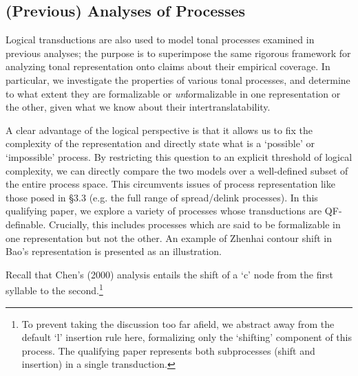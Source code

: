 \documentclass{article}
\begin{document}
\subsection{(Previous) Analyses of Processes}
Logical transductions are also used to model tonal processes examined in previous analyses; the purpose is to superimpose the same rigorous framework for analyzing tonal representation onto claims about their empirical coverage. In particular, we investigate the properties of various tonal processes, and determine to what extent they are formalizable or \emph{un}formalizable in one representation or the other, given what we know about their intertranslatability. \par
A clear advantage of the logical perspective is that it allows us to fix the complexity of the representation and directly state what is a `possible' or `impossible' process. By restricting this question to an explicit threshold of logical complexity, we can directly compare the two models over a well-defined subset of the entire process space. This circumvents issues of process representation like those posed in \S3.3 (e.g. the full range of spread/delink processes). In this qualifying paper, we explore a variety of processes whose transductions are QF-definable. Crucially, this includes processes which are said to be formalizable in one representation but not the other. An example of Zhenhai contour shift in Bao's representation is presented as an illustration.\par
Recall that Chen's (2000) analysis entails the shift of a `c' node from the first syllable to the second.\footnote{To prevent taking the discussion too far afield, we abstract away from the default `l' insertion rule here, formalizing only the `shifting' component of this process. The qualifying paper represents both subprocesses (shift and insertion) in a single transduction.}
\end{document}
